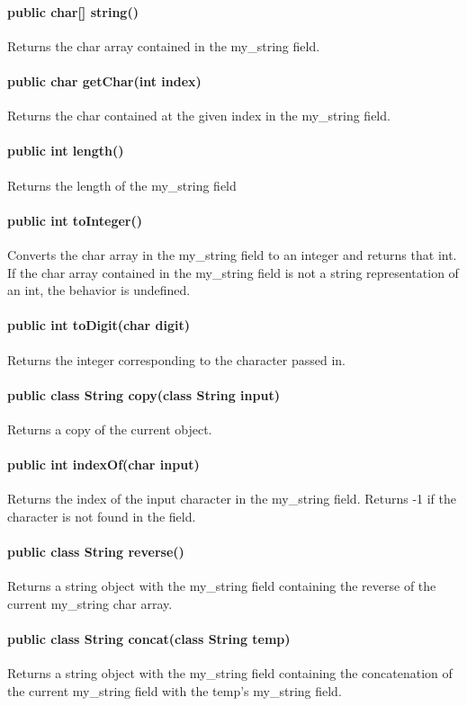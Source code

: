 \begin{homeworkProblem}
	\paragraph{public char[] string()}
	Returns the char array contained in the my\_string field.
	\paragraph{public char getChar(int index)}
	Returns the char contained at the given index in the my\_string field.
	\paragraph{public int length()}
	Returns the length of the my\_string field
	\paragraph{public int toInteger()}
	Converts the char array in the my\_string field to an integer and returns that int. If the char array contained in the my\_string field is not a  string representation of an int, the behavior is undefined.
	\paragraph{public int toDigit(char digit)}
	Returns the integer corresponding to the character passed in.
	\paragraph{public class String copy(class String input)}
	Returns a copy of the current object.
	\paragraph{public int indexOf(char input)}
	Returns the index of the input character in the my\_string field. Returns -1 if the character is not found in the field.
	\paragraph{public class String reverse()}
	Returns a string object with the my\_string field containing the reverse of the current my\_string char array.
	\paragraph{public class String concat(class String temp)}
	Returns a string object with the my\_string field containing the concatenation of the current my\_string field with the temp's my\_string field.

\end{homeworkProblem}
